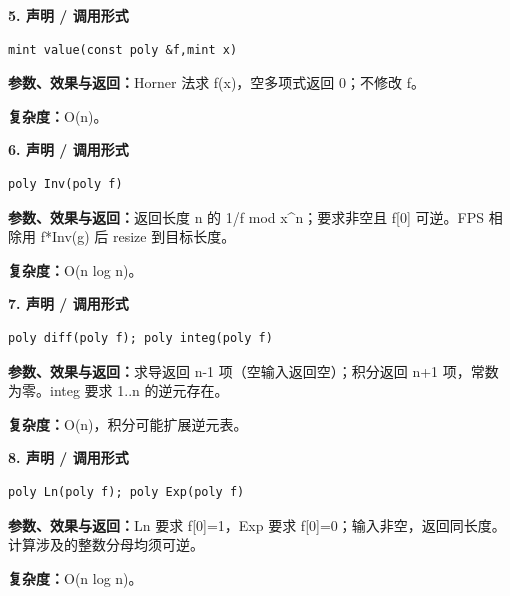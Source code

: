 \documentclass[UTF8,a4paper,10pt]{ctexart}
\begin{document}
\noindent\begin{minipage}{\textwidth}
\textbf{5. 声明 / 调用形式}
\begin{lstlisting}
mint value(const poly &f,mint x)
\end{lstlisting}
\textbf{参数、效果与返回：}Horner 法求 f(x)，空多项式返回 0；不修改 f。

\textbf{复杂度：}O(n)。

\end{minipage}\par\vspace{0.4em}
\noindent\begin{minipage}{\textwidth}
\textbf{6. 声明 / 调用形式}
\begin{lstlisting}
poly Inv(poly f)
\end{lstlisting}
\textbf{参数、效果与返回：}返回长度 n 的 1/f mod x\textasciicircum{}n；要求非空且 f[0] 可逆。FPS 相除用 f*Inv(g) 后 resize 到目标长度。

\textbf{复杂度：}O(n log n)。

\end{minipage}\par\vspace{0.4em}
\noindent\begin{minipage}{\textwidth}
\textbf{7. 声明 / 调用形式}
\begin{lstlisting}
poly diff(poly f); poly integ(poly f)
\end{lstlisting}
\textbf{参数、效果与返回：}求导返回 n-1 项（空输入返回空）；积分返回 n+1 项，常数为零。integ 要求 1..n 的逆元存在。

\textbf{复杂度：}O(n)，积分可能扩展逆元表。

\end{minipage}\par\vspace{0.4em}
\noindent\begin{minipage}{\textwidth}
\textbf{8. 声明 / 调用形式}
\begin{lstlisting}
poly Ln(poly f); poly Exp(poly f)
\end{lstlisting}
\textbf{参数、效果与返回：}Ln 要求 f[0]=1，Exp 要求 f[0]=0；输入非空，返回同长度。计算涉及的整数分母均须可逆。

\textbf{复杂度：}O(n log n)。

\end{minipage}\par\vspace{0.4em}
\end{document}
